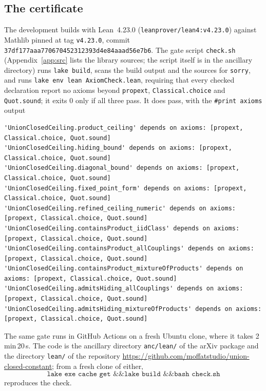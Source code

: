 \documentclass[11pt,a4paper]{article}
\theoremstyle{definition}
\theoremstyle{remark}
\begin{document}
\subsection{The certificate}\label{app:lean:check}
The development builds with Lean~4.23.0 (\texttt{leanprover/lean4:v4.23.0}) against Mathlib
pinned at tag \texttt{v4.23.0}, commit \texttt{37df177aaa770670452312393d4e84aaad56e7b6}. The
gate script \texttt{check.sh} (Appendix~\ref{app:src} lists the library sources; the script
itself is in the ancillary directory) runs \texttt{lake build}, scans the build output and
the sources for \texttt{sorry}, and runs \texttt{lake env lean AxiomCheck.lean}, requiring
that every checked declaration report no axioms beyond \texttt{propext},
\texttt{Classical.choice} and \texttt{Quot.sound}; it exits $0$ only if all three pass. It
does pass, with the \texttt{\#print axioms} output

\begin{Verbatim}[fontsize=\scriptsize,formatcom=\leanmono,samepage=false]
'UnionClosedCeiling.product_ceiling' depends on axioms: [propext, Classical.choice, Quot.sound]
'UnionClosedCeiling.hiding_bound' depends on axioms: [propext, Classical.choice, Quot.sound]
'UnionClosedCeiling.diagonal_bound' depends on axioms: [propext, Classical.choice, Quot.sound]
'UnionClosedCeiling.fixed_point_form' depends on axioms: [propext, Classical.choice, Quot.sound]
'UnionClosedCeiling.refined_ceiling_numeric' depends on axioms: [propext, Classical.choice, Quot.sound]
'UnionClosedCeiling.containsProduct_iidClass' depends on axioms: [propext, Classical.choice, Quot.sound]
'UnionClosedCeiling.containsProduct_allCouplings' depends on axioms: [propext, Classical.choice, Quot.sound]
'UnionClosedCeiling.containsProduct_mixtureOfProducts' depends on axioms: [propext, Classical.choice, Quot.sound]
'UnionClosedCeiling.admitsHiding_allCouplings' depends on axioms: [propext, Classical.choice, Quot.sound]
'UnionClosedCeiling.admitsHiding_mixtureOfProducts' depends on axioms: [propext, Classical.choice, Quot.sound]
\end{Verbatim}

The same gate runs in GitHub Actions on a fresh Ubuntu clone, where it takes 2\,min\,20\,s.
The code is the ancillary directory \texttt{anc/lean/} of the arXiv package and the directory
\texttt{lean/} of the repository \url{https://github.com/moffatstudio/union-closed-constant};
from a fresh clone of either,
\[\texttt{lake exe cache get \&\& lake build \&\& bash check.sh}\]
reproduces the check.
\end{document}
